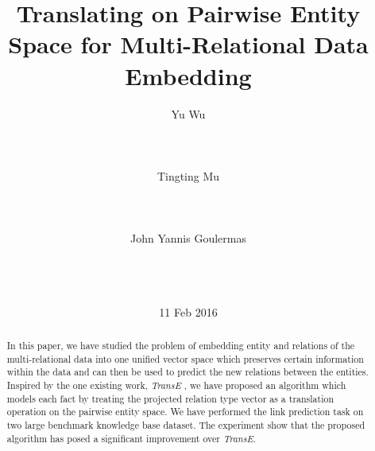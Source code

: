 \documentclass[9pt]{sig-alternate-05-2015}
\begin{document}

\title{Translating on Pairwise Entity Space for Multi-Relational Data Embedding}

%
\author{
\alignauthor
Yu Wu \\
       \\
       \\
       \\
\alignauthor
Tingting Mu \\
       \\
        \\
       \\
 \alignauthor
John Yannis Goulermas \\
       \\
        \\
       \\
 }
\date{11 Feb 2016}
             
\maketitle

\begin{abstract}
In this paper, we have studied the problem of embedding entity and relations of the multi-relational data into one unified vector space which preserves certain information within the data and can then be used to predict the new relations between the entities. Inspired by the one existing work, \emph{TransE} \cite{bordes_translating_2013}, we have proposed an algorithm which models each fact by treating the projected relation type vector as a translation operation on the pairwise entity space. We have performed the link prediction task on two large benchmark knowledge base dataset. The experiment show that the proposed algorithm has posed a significant improvement over  \emph{TransE}.
\end{abstract}

%
%
\end{document}
